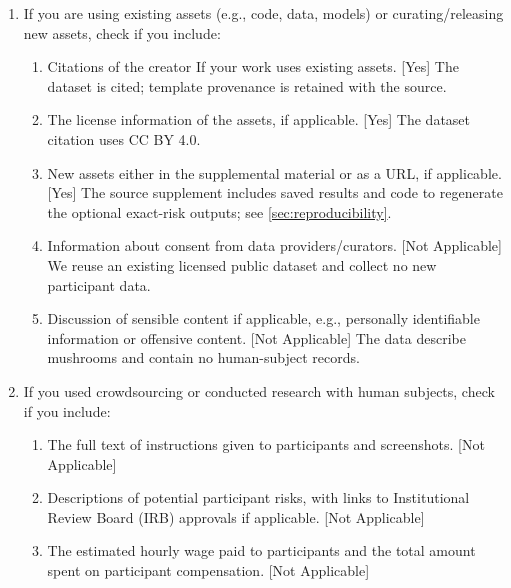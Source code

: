 \begin{enumerate}
      \item If you are using existing assets (e.g., code, data, models) or
            curating/releasing new assets, check if you include:
            \begin{enumerate}
                  \item Citations of the creator If your work uses existing
                        assets. [Yes] The dataset is cited; template provenance
                        is retained with the source.
                  \item The license information of the assets, if applicable.
                        [Yes] The dataset citation uses CC BY 4.0.
                  \item New assets either in the supplemental material or as a
                        URL, if applicable. [Yes] The source supplement includes
                        saved results and code to regenerate the optional
                        exact-risk outputs; see \cref{sec:reproducibility}.
                  \item Information about consent from data providers/curators.
                        [Not Applicable] We reuse an existing licensed public
                        dataset and collect no new participant data.
                  \item Discussion of sensible content if applicable, e.g.,
                        personally identifiable information or offensive
                        content. [Not Applicable] The data describe mushrooms
                        and contain no human-subject records.
            \end{enumerate}

      \item If you used crowdsourcing or conducted research with human subjects,
            check if you include:
            \begin{enumerate}
                  \item The full text of instructions given to participants and
                        screenshots. [Not Applicable]
                  \item Descriptions of potential participant risks, with links
                        to Institutional Review Board (IRB) approvals if
                        applicable. [Not Applicable]
                  \item The estimated hourly wage paid to participants and the
                        total amount spent on participant compensation. [Not
                        Applicable]
            \end{enumerate}
\end{enumerate}
